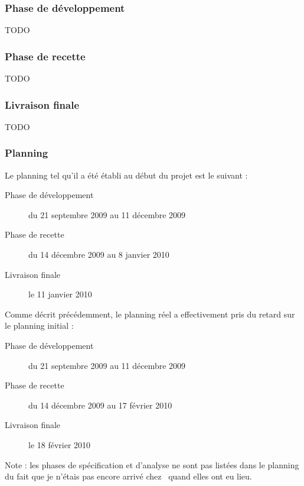 \subsubsection{Phase de développement}

TODO


\subsubsection{Phase de recette}

TODO


\subsubsection{Livraison finale}

TODO


\subsubsection{Planning}

Le planning tel qu'il a été établi au début du projet est le suivant :

\begin{description}
	\item[Phase de développement] du 21 septembre 2009 au 11 décembre 2009
	\item[Phase de recette] du 14 décembre 2009 au 8 janvier 2010
	\item[Livraison finale] le 11 janvier 2010
\end{description}

Comme décrit précédemment, le planning réel a effectivement pris du retard sur le planning initial :

\begin{description}
	\item[Phase de développement] du 21 septembre 2009 au 11 décembre 2009
	\item[Phase de recette] du 14 décembre 2009 au 17 février 2010
	\item[Livraison finale] le 18 février 2010
\end{description}

Note : les phases de spécification et d'analyse ne sont pas listées dans le planning du fait que je n'étais pas encore arrivé chez \asl\ quand elles ont eu lieu.
